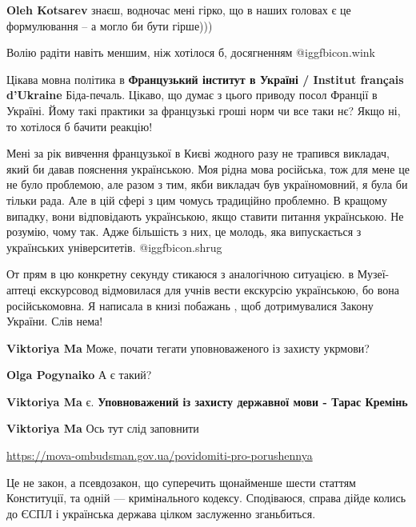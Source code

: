 \begin{itemize}
\begin{itemize} %
\textbf{Oleh Kotsarev} знаєш, водночас мені гірко, що в наших головах є це формулювання – а могло би бути гірше)))

Волію радіти навіть меншим, ніж хотілося б, досягненням  @igg{fbicon.wink} 
\end{itemize} %


Цікава мовна політика в \textbf{Французький інститут в Україні / Institut français
d'Ukraine} Біда-печаль. Цікаво, що думає з цього приводу посол Франції в
Україні. Йому такі практики за французькі гроші норм чи все таки нє? Якщо ні,
то хотілося б бачити реакцію!


Мені за рік вивчення французької в Києві жодного разу не трапився викладач,
який би давав пояснення українською. Моя рідна мова російська, тож для мене це
не було проблемою, але разом з тим, якби викладач був україномовний, я була би
тільки рада. Але в цій сфері з цим чомусь традиційно проблемно. В кращому
випадку, вони відповідають українською, якщо ставити питання українською. Не
розумію, чому так. Адже більшість з них, це молодь, яка випускається з
українських університетів.  @igg{fbicon.shrug} 


От прям в цю конкретну секунду стикаюся з аналогічною ситуацією. в Музеї-аптеці
екскурсовод відмовилася для учнів вести екскурсію українською, бо вона
російськомовна. Я написала в книзі побажань , щоб дотримувалися Закону України.
Слів нема!

\begin{itemize} %
\textbf{Viktoriya Ma} Може, почати тегати уповноваженого із захисту укрмови?

\textbf{Olga Pogynaiko} А є такий?

\textbf{Viktoriya Ma} є. \textbf{Уповноважений із захисту державної мови - Тарас Кремінь}

\textbf{Viktoriya Ma} Ось тут слід заповнити \par\url{https://mova-ombudsman.gov.ua/povidomiti-pro-porushennya}


Це не закон, а псевдозакон, що суперечить щонайменше шести статтям Конституції,
та одній — кримінального кодексу.  Сподіваюся, справа дійде колись до ЄСПЛ і
українська держава цілком заслуженно зганьбиться.


\end{itemize}
\end{itemize}
